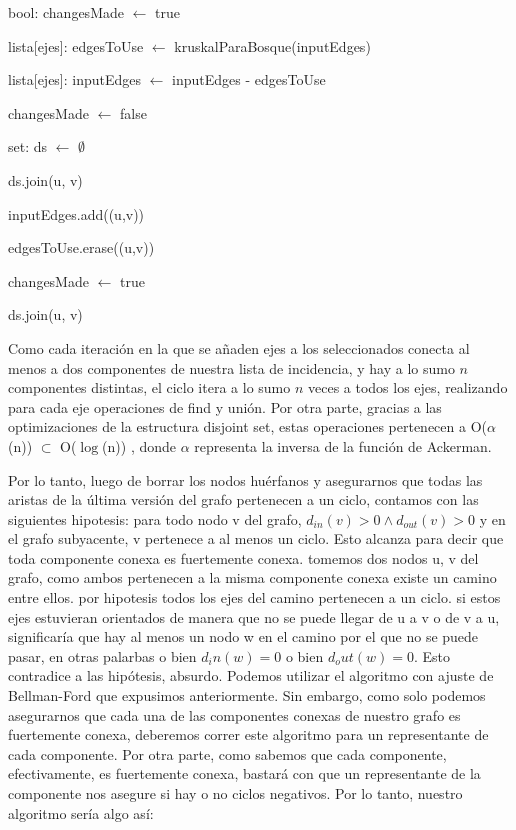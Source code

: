 \begin{algorithm}[H]
		\NoCaptionOfAlgo
		\caption{}
		
		bool: changesMade $\leftarrow$ true
		
		lista[ejes]: edgesToUse $\leftarrow$ kruskalParaBosque(inputEdges)

		lista[ejes]: inputEdges $\leftarrow$ inputEdges - edgesToUse

		{
			changesMade $\leftarrow$ false

			set: ds $\leftarrow$ $\emptyset$

			{
				ds.join(u, v)
			}

			{
					{
						inputEdges.add((u,v))

						edgesToUse.erase((u,v))

						changesMade $\leftarrow$ true
					}
					{
						ds.join(u, v)
					}
			}



		}
	\end{algorithm}
	
\par
Como cada iteración en la que se añaden ejes a los seleccionados conecta al menos a dos componentes de nuestra lista de incidencia, y hay a lo sumo $n$ componentes distintas, el ciclo itera a lo sumo $n$ veces a todos los ejes, realizando para cada eje operaciones de find y unión. Por otra parte, gracias a las optimizaciones de la estructura disjoint set, estas operaciones pertenecen a O($\alpha$(n)) $\subset$ O($\log$(n)) , donde $\alpha$ representa la inversa de la función de Ackerman.
\\
\par
Por lo tanto, luego de borrar los nodos huérfanos y asegurarnos que todas las aristas de la última versión del grafo pertenecen a un ciclo, contamos con las siguientes hipotesis: para todo nodo v del grafo, $d_{in} (v) > 0 \land d_{out} (v) > 0 $ y en el grafo subyacente, v pertenece a al menos un ciclo. Esto alcanza para decir que toda componente conexa es fuertemente conexa. tomemos dos nodos u, v del grafo, como ambos pertenecen a la misma componente conexa existe un camino entre ellos. por hipotesis todos los ejes del camino pertenecen a un ciclo. si estos ejes estuvieran orientados de manera que no se puede llegar de u a v o de v a u, significaría que hay al menos un nodo w en el camino por el que no se puede pasar, en otras palarbas o bien $d_in(w) = 0$ o bien $d_out(w) = 0$. Esto contradice a las hipótesis, absurdo.
 Podemos utilizar el algoritmo con ajuste de Bellman-Ford que expusimos anteriormente. Sin embargo, como solo podemos asegurarnos que cada una de las componentes conexas de nuestro grafo es fuertemente conexa, deberemos correr este algoritmo para un representante de cada componente. Por otra parte, como sabemos que cada componente, efectivamente, es fuertemente conexa, bastará con que un representante de la componente nos asegure si hay o no ciclos negativos. Por lo tanto, nuestro algoritmo sería algo así:


